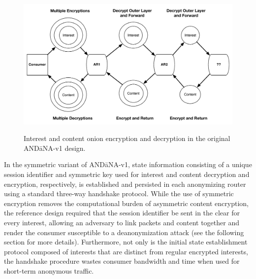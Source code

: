 \begin{figure}
\begin{center}
\includegraphics[scale=0.5]{./images/andana_v1_design.pdf}
\label{fig:andanav1_design}
\caption{Interest and content onion encryption and decryption in the original {\sf AND\=aNA-v1} design.}
\end{center}
\end{figure}

In the symmetric variant of {\sf AND\=aNA-v1}, state information consisting of a unique session identifier and symmetric key used for interest and content decryption and encryption, respectively, is established and persisted in each anonymizing router using a standard three-way handshake protocol. While the use of symmetric encryption removes the computational burden of asymmetric content encryption, the reference design required that the session identifier be sent in the clear for every interest, allowing an adversary to link packets and content together and render the consumer susceptible to a deanonymization attack (see the following section for more details). Furthermore, not only is the initial state establishment protocol composed of interests that are distinct from regular encrypted interests, the handshake procedure wastes consumer bandwidth and time when used for short-term anonymous traffic. 


